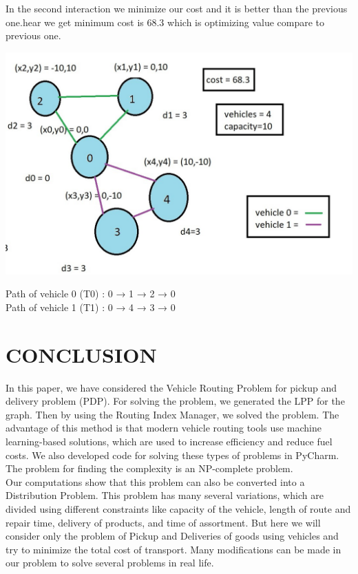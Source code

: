 \documentclass[conference]{IEEEtran}
\begin{document}
In the second interaction we minimize our cost and it is better than the previous one.hear we get minimum cost is 68.3 which is optimizing value compare to  previous one.\\
\vspace{5}
\begin{center}
\includegraphics[width=1\linewidth]{
opti_4.jpg}\par  
\end{center}
Path of vehicle 0 (T0) : 0 → 1 → 2 → 0\\
Path of vehicle 1 (T1) : 0 → 4 → 3 → 0\\

\section{{\textbf{CONCLUSION}}}
In this paper, we have considered the Vehicle Routing Problem for pickup and delivery problem (PDP). For solving the problem, we generated the LPP for the graph. Then by using the Routing Index Manager, we solved the problem. The advantage of this method is that modern vehicle routing tools use machine learning-based solutions, which are used to increase efficiency and reduce fuel costs. We also developed code for solving these types of problems in PyCharm. The problem for finding the complexity is an NP-complete problem.\\ 
Our computations show that this problem can also be converted into a Distribution Problem. This problem has many several variations, which are divided using different constraints like capacity of the vehicle, length of route and repair time, delivery of products, and time of assortment. But here we will consider only the problem of Pickup and Deliveries of goods using vehicles and try to minimize the total cost of transport. Many modifications can be made in our problem to solve several problems in real life.
\end{document}
